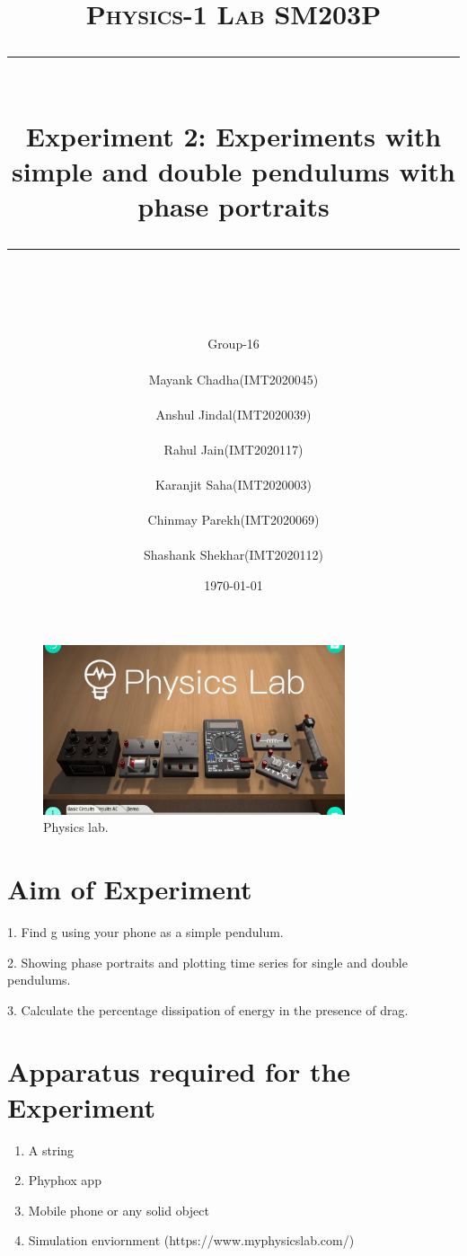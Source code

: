 \documentclass[11pt]{scrartcl} %
\title{	
	\normalfont\normalsize
	\textsc{\Huge Physics-1 Lab SM203P}\\ %
	\vspace{25pt} %
	\rule{\linewidth}{0.5pt}\\ %
	\vspace{20pt} %
	{\huge Experiment 2: Experiments with simple and double pendulums with phase portraits}\\ %
	\vspace{12pt} %
	\rule{\linewidth}{2pt}\\ %
	\vspace{12pt} %
}
\author{\Huge Group-16\\
\\
\LARGE Mayank Chadha(IMT2020045)\\
\\
\LARGE Anshul Jindal(IMT2020039)\\
\\
\LARGE Rahul Jain(IMT2020117)\\
\\
\LARGE Karanjit Saha(IMT2020003)\\
\\
\LARGE Chinmay Parekh(IMT2020069)\\
\\
\LARGE Shashank Shekhar(IMT2020112)} %
\date{\normalsize\today} %
\begin{document}
\maketitle %

\begin{figure}[h] %
	\centering
	\includegraphics[width=\textwidth, height=5cm]{first.jpg} %
	\caption{Physics lab.}
\end{figure}

\section{Aim of Experiment}
1. Find g using your phone as a simple pendulum. \par
2. Showing phase portraits and plotting time series for single and double pendulums.\par
3. Calculate the percentage dissipation of energy in the presence of drag. \par

\section{Apparatus required for the Experiment}
\begin{enumerate}
	\item A string
	\item Phyphox app
	\item Mobile phone or any solid object
	\item Simulation enviornment (https://www.myphysicslab.com/)
\end{enumerate}
\end{document}
